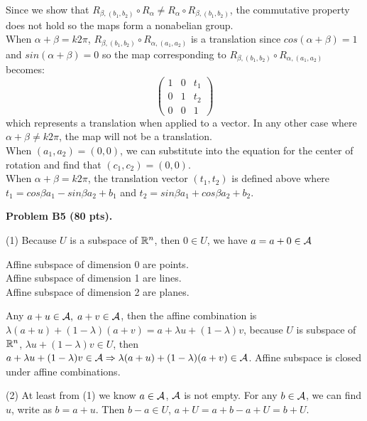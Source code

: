 \documentclass[12pt]{article}
\begin{document}
\medskip
Since we show that $R_{\beta,(b_1,b_2)} \circ R_{\alpha} \ne R_{\alpha} \circ R_{\beta,(b_1,b_2)}$, the commutative property does not hold so the maps form a nonabelian group.\\

When $\alpha + \beta = k2\pi$, $R_{\beta,(b_1,b_2)} \circ R_{\alpha,(a_1,a_2)}$ is a translation since $cos(\alpha + \beta)= 1$ and $sin(\alpha + \beta)=0$ so the map corresponding to $R_{\beta,(b_1,b_2)} \circ R_{\alpha,(a_1,a_2)}$ becomes:
$$\begin{pmatrix} 1 & 0 & t_1\\0&1& t_2\\0&0&1\end{pmatrix}$$ which represents a translation when applied to a vector. In any other case where $\alpha + \beta \ne k2\pi$, the map will not be a translation.\\

When $(a_1,a_2)=(0,0)$, we can substitute into the equation for the center of rotation and find that $(c_1,c_2)= (0,0)$.\\

When $\alpha + \beta = k2\pi$, the translation vector $(t_1,t_2)$ is defined above where $t_1= cos\beta a_1 - sin\beta a_2 + b_1$ and $t_2 = sin\beta a_1 + cos\beta a_2 + b_2$.

\vspace {0.5cm}\noindent
{\bf Problem B5 (80 pts).}

\medskip
(1)
Because $U$ is a subspace of $\mathbb{R}^n$, then $0 \in U$, we have $a = 
a + 0 \in {\cal A}$
\begin{center}
Affine subspace of dimension 0 are points. \\
Affine subspace of dimension 1 are lines. \\
Affine subspace of dimension 2 are planes. \\
\end{center}
Any $a + u \in {\cal A}, \; a + v \in {\cal A}$, then the affine combination is $\lambda (a + u) + (1 - \lambda) (a + v) = a + \lambda u + (1 - \lambda) v$, because $U$ is subspace of $\mathbb{R}^n$, $\lambda u + (1 - \lambda) v \in U$, then $a + \lambda u + (1 - \lambda) v \in {\cal A} \Rightarrow \lambda (a + u) + (1 - \lambda) (a + v) \in {\cal A}$. Affine subspace is closed under affine combinations.

\medskip
(2) At least from (1) we know $a \in {\cal A}$, ${\cal A}$ is not empty.
For any $b \in {\cal A}$, we can find $u$, write as $b = a + u$. Then   $b - a \in U$, $a + U = a + b - a + U = b + U$.
\end{document}

